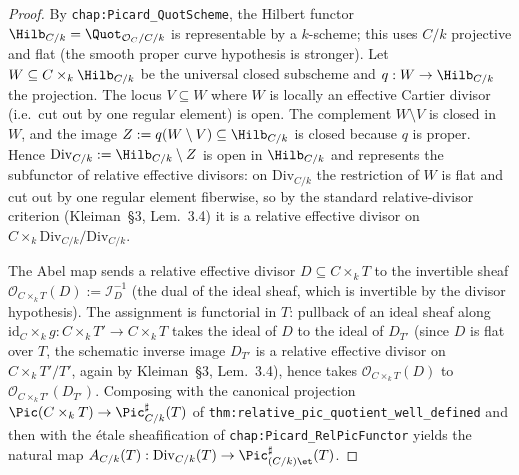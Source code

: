 \begin{proof}
  
  By \texttt{chap:Picard\_QuotScheme}, the Hilbert functor \(\Hilb_{C/k} =
  \Quot_{\mathcal{O}_C/C/k}\) is representable by a \(k\)-scheme; this uses
  \(C/k\) projective and flat (the smooth proper curve hypothesis is
  stronger). Let \(W \subseteq C \times_k \Hilb_{C/k}\) be the universal
  closed subscheme and \(q : W \to \Hilb_{C/k}\) the projection. The locus
  \(V \subseteq W\) where \(W\) is locally an effective Cartier divisor (i.e.\
  cut out by one regular element) is open. The complement \(W \setminus V\)
  is closed in \(W\), and the image \(Z := q(W \setminus V) \subseteq
  \Hilb_{C/k}\) is closed because \(q\) is proper. Hence \(\mathrm{Div}_{C/k} :=
  \Hilb_{C/k} \setminus Z\) is open in \(\Hilb_{C/k}\) and represents the
  subfunctor of relative effective divisors: on \(\mathrm{Div}_{C/k}\) the
  restriction of \(W\) is flat and cut out by one regular element fiberwise,
  so by the standard relative-divisor criterion (Kleiman~\S 3,
  Lem.~3.4) it is a relative effective divisor on \(C \times_k
  \mathrm{Div}_{C/k} / \mathrm{Div}_{C/k}\).

  The Abel map sends a relative effective divisor \(D \subseteq C \times_k T\)
  to the invertible sheaf \(\mathcal{O}_{C \times_k T}(D) := \mathcal{I}_D^{-1}\)
  (the dual of the ideal sheaf, which is invertible by the divisor
  hypothesis). The assignment is functorial in \(T\): pullback of an ideal
  sheaf along \(\mathrm{id}_C \times_k g : C \times_k T' \to C \times_k T\)
  takes the ideal of \(D\) to the ideal of \(D_{T'}\) (since \(D\) is flat over
  \(T\), the schematic inverse image \(D_{T'}\) is a relative effective
  divisor on \(C \times_k T'/T'\), again by Kleiman~\S 3, Lem.~3.4), hence
  takes \(\mathcal{O}_{C \times_k T}(D)\) to \(\mathcal{O}_{C \times_k T'}(D_{T'})\).
  Composing with the canonical projection
  \(\Pic(C \times_k T) \to \Pic^\sharp_{C/k}(T)\) of
  \texttt{thm:relative\_pic\_quotient\_well\_defined} and then with the
  \'etale sheafification of \texttt{chap:Picard\_RelPicFunctor} yields the
  natural map \(A_{C/k}(T) : \mathrm{Div}_{C/k}(T) \to \Pic^\sharp_{(C/k)\et}(T)\).
\end{proof}

